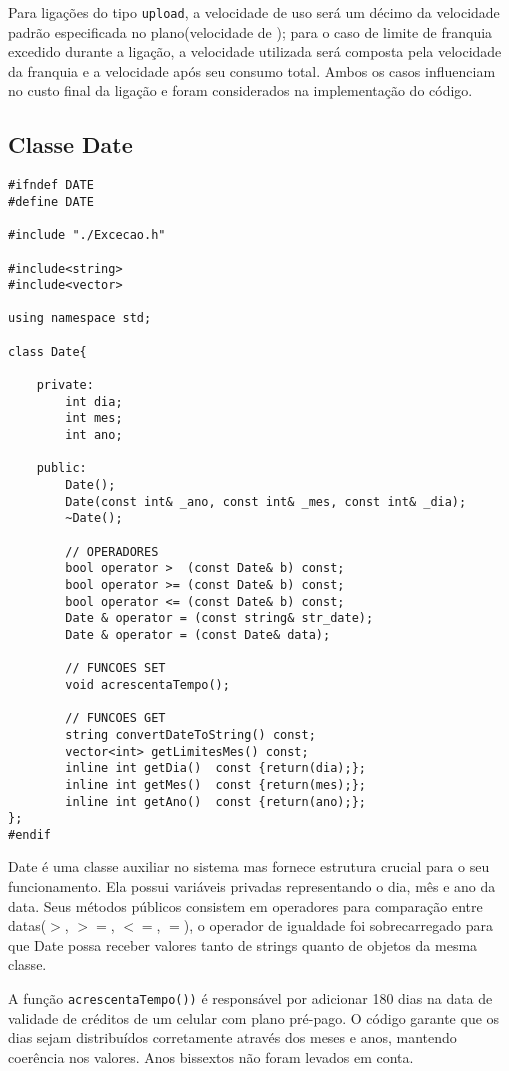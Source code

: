 Para ligações do tipo \texttt{upload}, a velocidade de uso será um décimo da velocidade padrão especificada no plano(velocidade de ); para o caso de limite de franquia excedido durante a ligação, a velocidade utilizada será composta pela velocidade da franquia e a velocidade após seu consumo total. Ambos os casos influenciam no custo final da ligação e foram considerados na implementação do código.


\subsection{Classe Date} \label{sec:date}

\begin{lstlisting}[basicstyle=\tiny]
#ifndef DATE
#define DATE

#include "./Excecao.h"

#include<string>
#include<vector>

using namespace std;

class Date{
	
	private:
		int dia;
		int mes;
		int ano;
	
	public:
		Date();
		Date(const int& _ano, const int& _mes, const int& _dia);
		~Date();
	
		// OPERADORES
		bool operator >  (const Date& b) const;
		bool operator >= (const Date& b) const;
		bool operator <= (const Date& b) const;
		Date & operator = (const string& str_date);
		Date & operator = (const Date& data);
		
		// FUNCOES SET
		void acrescentaTempo();
		
		// FUNCOES GET
		string convertDateToString() const;
		vector<int> getLimitesMes() const;
		inline int getDia()  const {return(dia);};
		inline int getMes()  const {return(mes);};
		inline int getAno()  const {return(ano);};
};
#endif
\end{lstlisting}

Date é uma classe auxiliar no sistema mas fornece estrutura crucial para o seu funcionamento. Ela possui variáveis privadas representando o dia, mês e ano da data. Seus métodos públicos consistem em operadores para comparação entre datas($>$, $>=$, $<=$, $=$), o operador de igualdade foi sobrecarregado para que Date possa receber valores tanto de strings quanto de objetos da mesma classe. 

A função \texttt{acrescentaTempo())} é responsável por adicionar 180 dias na data de validade de créditos de um celular com plano pré-pago. O código garante que os dias sejam distribuídos corretamente através dos meses e anos, mantendo coerência nos valores. Anos bissextos não foram levados em conta.
	
